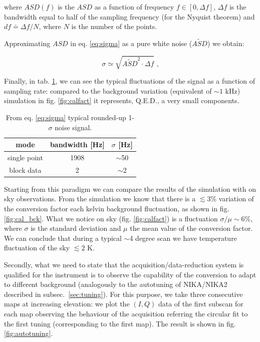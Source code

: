 \documentclass[twocolumn,traditabstract]{aa}\\
\begin{document}
\noindent where $ASD(f)$ is the $ASD$ as a function of frequency $f\in[0,\Delta f]$, $\Delta f$ is the bandwidth equal to half of the sampling frequency (for the Nyquist theorem) and $df\doteq\Delta f/N$, where $N$ is the number of the points.

\noindent Approximating $ASD$ in eq. \ref{eq:sigma} as a pure white noise ($\tilde{ASD}$) we obtain:

\begin{equation}
\sigma\simeq \sqrt{ \tilde{ASD}^2 \cdot \Delta f } \text{ ,}
\end{equation}

\noindent Finally, in tab. \ref{tab:sigma_sig}, we can see the typical fluctuations of the signal as a function of sampling rate: compared to the background variation (equivalent of $\sim 1$ kHz) simulation in fig. \ref{fig:calfact} it represents, Q.E.D., a very small components.

\begin{table}[htf]
	\footnotesize
	\centering
	\caption{From eq. \ref{eq:sigma} typical rounded-up 1-$\sigma$ noise signal.}
	\begin{tabular}{ccc}
		\toprule
		\textbf{mode} & \textbf{bandwidth [Hz]} & \textbf{$\sigma$ [Hz]} \\
		\toprule
		single point & 1908 & $\sim$50 \\ 
		\midrule 
		block data & 2 & $\sim$2 \\ 
		\bottomrule
	\end{tabular}
	\label{tab:sigma_sig}
\end{table}

Starting from this paradigm we can compare the results of the simulation with on sky observations. From the simulation we know that there is a $\lesssim 3\%$ variation of the conversion factor each kelvin background fluctuation, as shown in fig. \ref{fig:cal_bck}. What we notice on sky (fig. \ref{fig:calfact}) is a fluctuation $\sigma/\mu\sim6\%$, where $\sigma$ is the standard deviation and $\mu$ the mean value of the conversion factor. We can conclude that during a typical $\sim$4 degree scan we have temperature fluctuation of the sky $\lesssim 2$ K.

Secondly, what we need to state that the acquisition/data-reduction system is qualified for the instrument is to observe the capability of the conversion to adapt to different background (analogously to the autotuning of NIKA/NIKA2 described in subsec.~\ref{sec:tuning}). For this purpose, we take three consecutive maps at increasing elevation: we plot the $(I,Q)$ data of the first subscan for each map observing the behaviour of the acquisition referring the circular fit to the first tuning (corresponding to the first map). The result is shown in fig. \ref{fig:autotuning}.
\end{document}
